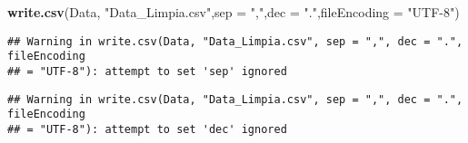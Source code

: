 \documentclass[]{article}
\newenvironment{Shaded}{\begin{snugshade}}{\end{snugshade}}
\newcommand{\DataTypeTok}[1]{\textcolor[rgb]{0.13,0.29,0.53}{#1}}
\newcommand{\KeywordTok}[1]{\textcolor[rgb]{0.13,0.29,0.53}{\textbf{#1}}}
\newcommand{\NormalTok}[1]{#1}
\newcommand{\StringTok}[1]{\textcolor[rgb]{0.31,0.60,0.02}{#1}}
\begin{document}
\begin{Shaded}
\begin{Highlighting}[]
\KeywordTok{write.csv}\NormalTok{(Data, }\StringTok{"Data_Limpia.csv"}\NormalTok{,}\DataTypeTok{sep =} \StringTok{","}\NormalTok{,}\DataTypeTok{dec =} \StringTok{"."}\NormalTok{,}\DataTypeTok{fileEncoding =} \StringTok{"UTF-8"}\NormalTok{)}
\end{Highlighting}
\end{Shaded}

\begin{verbatim}
## Warning in write.csv(Data, "Data_Limpia.csv", sep = ",", dec = ".", fileEncoding
## = "UTF-8"): attempt to set 'sep' ignored
\end{verbatim}

\begin{verbatim}
## Warning in write.csv(Data, "Data_Limpia.csv", sep = ",", dec = ".", fileEncoding
## = "UTF-8"): attempt to set 'dec' ignored
\end{verbatim}
\end{document}

